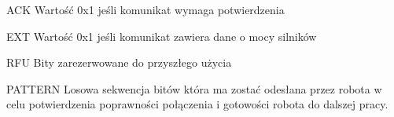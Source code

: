 \begin{basedescript}{\desclabelstyle{\pushlabel}\desclabelwidth{25mm}}
\setlength{\parsep}{0pt}
\setlength{\itemsep}{0mm}
\setlength{\parskip}{0pt}
\item[ACK]
	Wartość 0x1 jeśli komunikat wymaga potwierdzenia
\item[EXT] 
	Wartość 0x1 jeśli komunikat zawiera dane o mocy silników
\item[RFU] 
	Bity zarezerwowane do przyszłego użycia
\item[PATTERN] 
	Losowa sekwencja bitów która ma zostać odesłana przez robota w celu
	potwierdzenia poprawności połączenia i gotowości robota do dalszej pracy.
\end{basedescript}